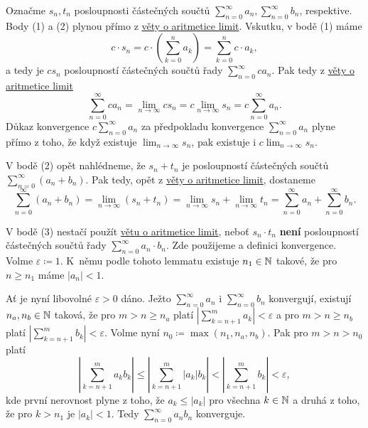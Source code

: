 \begin{propproof}
 Označme $s_n,t_n$ posloupnosti částečných součtů $\sum_{n=0}^{\infty} a_n,
 \sum_{n=0}^{\infty} b_n$, respektive. Body (1) a (2) plynou přímo z
 \hyperref[thm:aritmetika-limit]{věty o aritmetice limit}. Vskutku, v bodě (1)
 máme
 \[
  c \cdot s_n = c \cdot \left( \sum_{k=0}^{n} a_k \right) = \sum_{k=0}^{n} c
  \cdot a_k,
 \]
 a tedy je $cs_n$ posloupností částečných součtů řady $\sum_{n=0}^{\infty}
 ca_n$. Pak tedy z \hyperref[thm:aritmetika-limit]{věty o aritmetice limit}
 \[
  \sum_{n=0}^{\infty} ca_n = \lim_{n \to \infty} cs_n = c \lim_{n \to \infty}
  s_n = c \sum_{n=0}^{\infty} a_n.
 \]
 Důkaz konvergence $c \sum_{n=0}^{\infty} a_n$ za předpokladu konvergence
 $\sum_{n=0}^{\infty} a_n$ plyne přímo z toho, že když existuje $\lim_{n \to
 \infty} s_n$, pak existuje i $c \lim_{n \to \infty} s_n$.

 V bodě (2) opět nahlédneme, že $s_n+t_n$ je posloupností částečných součtů
 $\sum_{n=0}^{\infty} (a_n + b_n)$. Pak tedy, opět z
 \hyperref[thm:aritmetika-limit]{věty o aritmetice limit}, dostaneme
 \[
  \sum_{n=0}^{\infty} (a_n+b_n) = \lim_{n \to \infty} (s_n + t_n) = \lim_{n \to
  \infty} s_n + \lim_{n \to \infty} t_n = \sum_{n=0}^{\infty} a_n +
  \sum_{n=0}^{\infty} b_n.
 \]

 V bodě (3) nestačí použít \hyperref[thm:aritmetika-limit]{větu o aritmetice
 limit}, neboť $s_n \cdot t_n$ \textbf{není} posloupností částečných součtů řady
 $\sum_{n=0}^{\infty} a_n \cdot b_n$. Zde použijeme
  a definici konvergence.
 Volme $\varepsilon \coloneqq 1$. K~němu podle tohoto lemmatu existuje $n_1 \in
 \mathbb{N}$ takové, že pro $n \geq n_1$ máme $|a_n| < 1$.

 Ať je nyní libovolné $\varepsilon>0$ dáno. Ježto $\sum_{n=0}^{\infty} a_n$ i
 $\sum_{n=0}^{\infty} b_n$ konvergují, existují $n_a, n_b \in \mathbb{N}$ taková, že pro
 $m > n \geq n_a$ platí $| \sum_{k=n+1}^{m} a_k | < \varepsilon$ a pro $m > n
 \geq n_b$ platí $| \sum_{k=n+1}^{m} b_k| < \varepsilon$. Volme nyní $n_0
 \coloneqq \max(n_1,n_a,n_b)$. Pak pro $m > n > n_0$ platí
 \[
  \left| \sum_{k=n+1}^{m} a_k b_k \right| \leq \left| \sum_{k=n+1}^{m} |a_k|b_k
  \right| < \left| \sum_{k=n+1}^{m} b_k \right| < \varepsilon,
 \]
 kde první nerovnost plyne z toho, že $a_k \leq |a_k|$ pro všechna $k \in \mathbb{N}$ a
 druhá z toho, že pro $k>n_1$ je $|a_k|<1$. Tedy $\sum_{n=0}^{\infty} a_nb_n$
 konverguje. 
\end{propproof}

